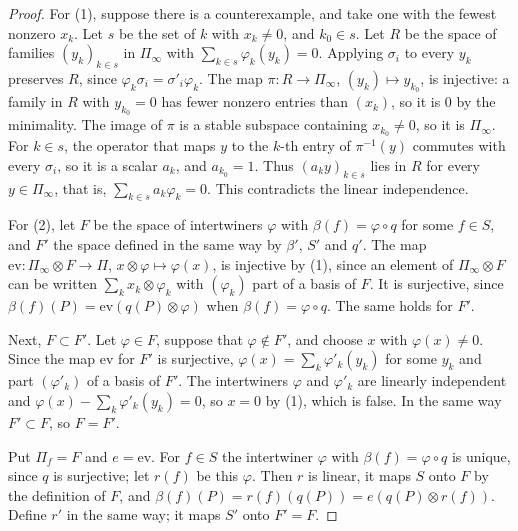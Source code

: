 \begin{proof}
For (1), suppose there is a counterexample, and take one with the fewest
nonzero $x_k$. Let $s$ be the set of $k$ with $x_k\neq0$, and $k_0\in s$. Let
$R$ be the space of families $(y_k)_{k\in s}$ in $\Pi_\infty$ with
$\sum_{k\in s}\varphi_k(y_k)=0$. Applying $\sigma_i$ to every $y_k$ preserves
$R$, since $\varphi_k\sigma_i=\sigma'_i\varphi_k$. The map
$\pi\colon R\to\Pi_\infty$, $(y_k)\mapsto y_{k_0}$, is injective: a family in
$R$ with $y_{k_0}=0$ has fewer nonzero entries than $(x_k)$, so it is $0$ by
the minimality. The image of $\pi$ is a stable subspace containing
$x_{k_0}\neq0$, so it is $\Pi_\infty$. For $k\in s$, the operator that maps $y$
to the $k$-th entry of $\pi^{-1}(y)$ commutes with every $\sigma_i$, so it is a
scalar $a_k$, and $a_{k_0}=1$. Thus $(a_ky)_{k\in s}$ lies in $R$ for every
$y\in\Pi_\infty$, that is, $\sum_{k\in s}a_k\varphi_k=0$. This contradicts the
linear independence.

For (2), let $F$ be the space of intertwiners $\varphi$ with
$\beta(f)=\varphi\circ q$ for some $f\in S$, and $F'$ the space defined in the
same way by $\beta'$, $S'$ and $q'$. The map
$\mathrm{ev}\colon\Pi_\infty\otimes F\to\Pi$, $x\otimes\varphi\mapsto\varphi(x)$,
is injective by (1), since an element of $\Pi_\infty\otimes F$ can be written
$\sum_kx_k\otimes\varphi_k$ with $(\varphi_k)$ part of a basis of $F$. It is
surjective, since $\beta(f)(P)=\mathrm{ev}(q(P)\otimes\varphi)$ when
$\beta(f)=\varphi\circ q$. The same holds for $F'$.

Next, $F\subset F'$. Let $\varphi\in F$, suppose that $\varphi\notin F'$, and
choose $x$ with $\varphi(x)\neq0$. Since the map $\mathrm{ev}$ for $F'$ is
surjective, $\varphi(x)=\sum_k\varphi'_k(y_k)$ for some $y_k$ and part
$(\varphi'_k)$ of a basis of $F'$. The intertwiners $\varphi$ and $\varphi'_k$
are linearly independent and $\varphi(x)-\sum_k\varphi'_k(y_k)=0$, so $x=0$ by
(1), which is false. In the same way $F'\subset F$, so $F=F'$.

Put $\Pi_f=F$ and $e=\mathrm{ev}$. For $f\in S$ the intertwiner $\varphi$ with
$\beta(f)=\varphi\circ q$ is unique, since $q$ is surjective; let $r(f)$ be
this $\varphi$. Then $r$ is linear, it maps $S$ onto $F$ by the definition of
$F$, and $\beta(f)(P)=r(f)(q(P))=e(q(P)\otimes r(f))$. Define $r'$ in the same
way; it maps $S'$ onto $F'=F$.
\end{proof}

